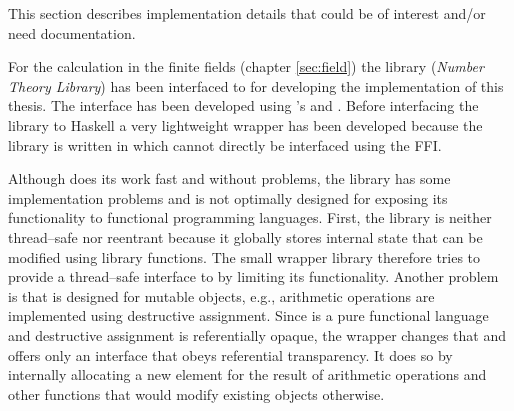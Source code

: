 %
%
\label{sec:implementation-details}

This section describes implementation details that could be of interest and/or
need documentation.

\label{sec:finite-field-calcs}

For the calculation in the finite fields (chapter \ref{sec:field}) the \JWTcpp{}
library \JWTLntl{} (\emph{Number Theory Library}) has been interfaced to
\JWThaskell{} for developing the implementation of this thesis. The interface
has been developed using \JWThaskell{}'s 
\cite{haskell2010} and  \cite{c2hs}.
Before interfacing the library to Haskell a very lightweight \JWTc{} wrapper
has been developed because the library is written in \JWTcpp{} which cannot
directly be interfaced using the FFI.

Although \JWTntl{} does its work fast and without problems, the library has some
implementation problems and is not optimally designed for exposing its
functionality to functional programming languages. First, the library is
neither thread--safe nor reentrant because it globally stores internal state
that can be modified using library functions. The small \JWTc{} wrapper library
therefore tries to provide a thread--safe interface to \JWTntl{} by limiting its
functionality.  Another problem is that \JWTntl{} is designed for mutable
objects, e.g., arithmetic operations are implemented using destructive
assignment.  Since \JWThaskell{} is a pure functional language
\cite{haskell2010} and destructive assignment is referentially opaque, the
\JWTc{} wrapper changes that and offers only an interface that obeys referential
transparency. It does so by internally allocating a new element for the result
of arithmetic operations and other functions that would modify existing objects
otherwise.

